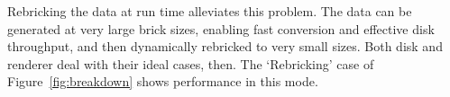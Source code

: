 
Rebricking the data at run time alleviates this problem.  The data can
be generated at very large brick sizes, enabling fast conversion and
effective disk throughput, and then dynamically rebricked to very small
sizes.  Both disk and renderer deal with their ideal cases, then.  The
`Rebricking' case of Figure~\ref{fig:breakdown} shows performance in
this mode.


% 
% 
%
%


